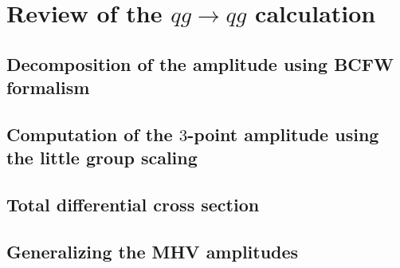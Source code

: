 \chapter{Review of the $qg \longrightarrow qg$ calculation}
\label{review}

\section{Decomposition of the amplitude using BCFW formalism}

\section{Computation of the $3$-point amplitude using the little group scaling}


\section{Total differential cross section}


\section{Generalizing the MHV amplitudes}



